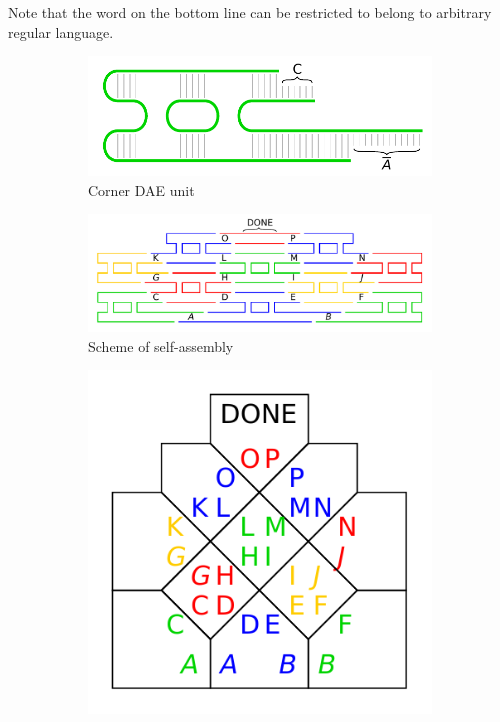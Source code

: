 Note that the word on the bottom line can be restricted to belong to arbitrary regular language.


\begin{figure}[H]
\begin{center}
	\begin{subfigure}[b]{0.31\textwidth}
		\includegraphics[width=\textwidth]{./figures/tile_model/DNA_struct.pdf} %
		\caption{Corner DAE unit}
		\label{fig:DNA_struct}
	\end{subfigure}
	\begin{subfigure}[b]{0.472\textwidth}
		\includegraphics[width=\textwidth]{./figures/tile_model/DNA_assembly.pdf} %
		\caption{Scheme of self-assembly}
		\label{fig:DNA_assembly}
	\end{subfigure}
	\begin{subfigure}[b]{0.190\textwidth}
		\includegraphics[width=\textwidth]{./figures/tile_model/abstract_model.pdf} %

\end{subfigure}
\end{center}
\end{figure}
